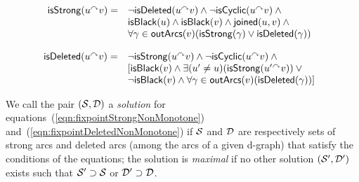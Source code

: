 \begin{equation}\label{eqn:fixpointStrongNonMonotone}
\!\!\!\!  \begin{array}{rl}
    \isStrong(u\arc v) = & \lnot \isDeleted(u\arc v) \land \lnot \isCyclic(u\arc v) \land{} \\
    & \isBlack(u) \land \isBlack(v) \land \joined(u,v) \land{} \\
    & \forall \gamma \in \outArcs(v)
       (\isStrong(\gamma) \lor \isDeleted(\gamma))
  \end{array}
\end{equation}

\begin{equation}\label{eqn:fixpointDeletedNonMonotone}
\!\!\!\!   \begin{array}{rl}
    \isDeleted(u\arc v) = & \lnot \isStrong(u\arc v) \land \lnot \isCyclic(u\arc v)  \land{}\\
    & [\isBlack(v) \land \exists(u'\neq u) (\isStrong(u'\arc v)) \lor{}\\
    & \lnot \isBlack(v) \land \forall\gamma \in \outArcs(v) (\isDeleted(\gamma))]
  \end{array}
\end{equation}

We call the pair $(\S,\D)$ a \emph{solution} for
equations~(\ref{eqn:fixpointStrongNonMonotone})
and~(\ref{eqn:fixpointDeletedNonMonotone}) if $\S$ and $\D$ are respectively
sets of strong arcs and deleted arcs (among the arcs of a given d-graph) that satisfy the conditions of the equations; the solution is
\emph{maximal} if no other solution $(\S',\D')$ exists such that $\S'\supset
\S$ or $\D'\supset \D$.

